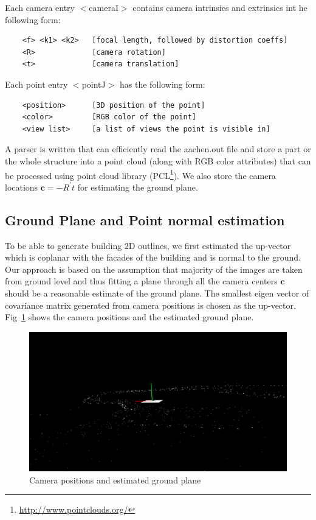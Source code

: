 \documentclass[10pt,twocolumn,letterpaper]{article}
\begin{document}
Each camera entry $<$cameraI$>$ contains camera intrinsics and extrinsics int he following form:

{\scriptsize
\begin{verbatim}
    <f> <k1> <k2>   [focal length, followed by distortion coeffs]
    <R>             [camera rotation]
    <t>             [camera translation]
\end{verbatim}
}

Each point entry $<$pointJ$>$ has the following form:

{\scriptsize
\begin{verbatim}
    <position>      [3D position of the point]
    <color>         [RGB color of the point]
    <view list>     [a list of views the point is visible in]
\end{verbatim}
}

A parser is written that can efficiently read the aachen.out file and store a part or the whole structure into a point cloud (along with RGB color attributes) that can be processed using point cloud library (PCL\footnote{\url{http://www.pointclouds.org/}}). We also store the camera locations $\textbf{c} = -R^{'}t$ for estimating the ground plane.

\subsection{Ground Plane and Point normal estimation}
To be able to generate building 2D outlines, we first estimated the up-vector which is coplanar with the facades of the building and is normal to the ground. Our approach is based on the assumption that majority of the images are taken from ground level and thus fitting a plane through all the camera centers $\textbf{c}$ should be a reasonable estimate of the ground plane. The smallest eigen vector of covariance matrix generated from camera positions is chosen as the up-vector. Fig~\ref{fig:ground} shows the camera positions and the estimated ground plane.

\begin{figure}[h]
   \centering
   \includegraphics[width=\linewidth]{images/ground_plane.png}
   \caption{Camera positions and estimated ground plane}
   \label{fig:ground}
\end{figure}
\end{document}

